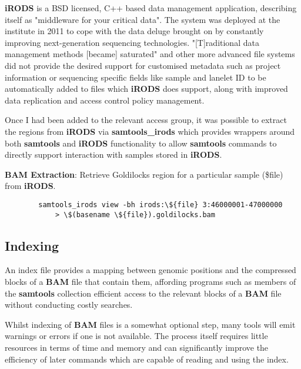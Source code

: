 \textbf{iRODS} is a BSD licensed, C++ based data management application,
describing itself as "middleware for your critical data"\citep{github:irods}.
The system was deployed at the institute in 2011 to cope with the data deluge
brought on by constantly improving next-generation sequencing technologies.
"[T]raditional data management methods [became] saturated" and other more
advanced file systems did not provide the desired support for customised metadata
such as project information or sequencing specific fields like sample and
lanelet ID to be automatically added to files\citep{irods-sanger} which
\textbf{iRODS} does support, along with improved data replication and access
control policy management.

Once I had been added to the relevant access group, it was possible to extract
the regions from \textbf{iRODS} via
\textbf{samtools\_irods}\citep{github:samtools-irods} which provides wrappers
around both \textbf{samtools} and \textbf{iRODS} functionality to allow
\textbf{samtools} commands to directly support interaction with samples stored
in \textbf{iRODS}.

\begin{listing}[H]
    \caption[bamext]{\textbf{BAM Extraction}: Retrieve Goldilocks region for
        a particular sample (\$file) from \textbf{iRODS}.}
    \label{list:bamext}
    \begin{verbatim}
        samtools_irods view -bh irods:\${file} 3:46000001-47000000
            > \$(basename \${file}).goldilocks.bam
    \end{verbatim}
\end{listing}


\subsection{Indexing}

An index file provides a mapping between genomic positions and the compressed
blocks of a \textbf{BAM} file that contain them, affording programs such as
members of the \textbf{samtools} collection efficient access to the relevant
blocks of a \textbf{BAM} file without conducting costly searches.

Whilst indexing of \textbf{BAM} files is a somewhat optional step, many tools
will emit warnings or errors if one is not available. The process itself
requires little resources in terms of time and memory and can significantly
improve the efficiency of later commands which are capable of reading and using
the index.

